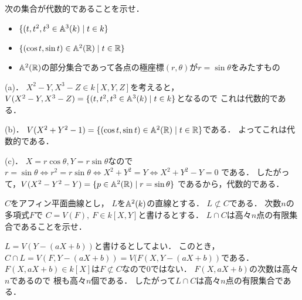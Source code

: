 \begin{prob}
  次の集合が代数的であることを示せ．
  \begin{itemize}
    \item[(a)] $\{ (t,t^2,t^3 \in \mathbb{A}^3(k) \mid t \in k \}$
    \item[(b)] $\{ (\cos t, \sin t) \in \mathbb{A}^2(\mathbb{R}) \mid t \in \mathbb{R} \} $
    \item[(c)] $\mathbb{A}^2(\mathbb{R})$の部分集合であって各点の極座標$(r,\theta)$が$r=\sin \theta$をみたすもの
  \end{itemize}
\end{prob}
\begin{ans}
  (a)．
  $X^2-Y, X^3-Z \in k[X,Y,Z]$を考えると，
  $V(X^2-Y,X^3-Z) = \{ (t,t^2,t^3 \in \mathbb{A}^3(k) \mid t \in k \}$となるので
  これは代数的である．
  
  (b)．
  $V(X^2 + Y^2 - 1) = \{ (\cos t, \sin t) \in \mathbb{A}^2(\mathbb{R}) \mid t \in \mathbb{R} \} $である．
  よってこれは代数的である．

  (c)．
  $X = r \cos \theta, Y = r \sin \theta$なので
  $ r = \sin \theta
  \Leftrightarrow r^2 = r \sin \theta
  \Leftrightarrow X^2 + Y^2 = Y
  \Leftrightarrow X^2 + Y^2 - Y = 0 $
  である．
  したがって，$V(X^2 - Y^2 - Y) = \{ p \in \mathbb{A}^2(\mathbb{R}) \mid r = \sin \theta \} $
  であるから，代数的である．
\end{ans}

\begin{prob}
  $C$をアフィン平面曲線とし，
  $L$を$\mathbb{A}^2(k)$の直線とする．
  $L \not \subset C$である．
  次数$n$の多項式$F$で
  $C = V(F), \ F \in k[X,Y]$と書けるとする．
  $L \cap C$は高々$n$点の有限集合であることを示せ．
\end{prob}
\begin{ans}
  $L = V(Y-(aX+b))$と書けるとしてよい．
  このとき，
  $C \cap L = V( F, Y-(aX+b) ) = V( F(X,Y-(aX+b) )$である．
  $F(X,aX+b) \in k[X]$は$F \not \subset C$なので$0$ではない．
  $F(X,aX+b)$の次数は高々$n$であるので
  根も高々$n$個である．
  したがって$L\cap C$は高々$n$点の有限集合である．
\end{ans}

